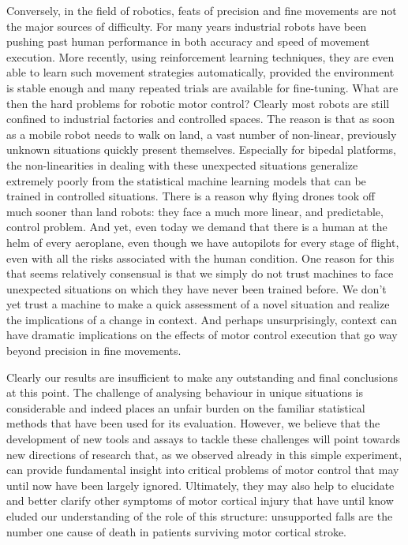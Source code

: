 Conversely, in the field of robotics, feats of precision and fine movements are not the major sources of difficulty. For many years industrial robots have been pushing past human performance in both accuracy and speed of movement execution. More recently, using reinforcement learning techniques, they are even able to learn such movement strategies automatically, provided the environment is stable enough and many repeated trials are available for fine-tuning. What are then the hard problems for robotic motor control? Clearly most robots are still confined to industrial factories and controlled spaces. The reason is that as soon as a mobile robot needs to walk on land, a vast number of non-linear, previously unknown situations quickly present themselves. Especially for bipedal platforms, the non-linearities in dealing with these unexpected situations generalize extremely poorly from the statistical machine learning models that can be trained in controlled situations. There is a reason why flying drones took off much sooner than land robots: they face a much more linear, and predictable, control problem. And yet, even today we demand that there is a human at the helm of every aeroplane, even though we have autopilots for every stage of flight, even with all the risks associated with the human condition. One reason for this that seems relatively consensual is that we simply do not trust machines to face unexpected situations on which they have never been trained before. We don't yet trust a machine to make a quick assessment of a novel situation and realize the implications of a change in context. And perhaps unsurprisingly, context can have dramatic implications on the effects of motor control execution that go way beyond precision in fine movements.

Clearly our results are insufficient to make any outstanding and final conclusions at this point. The challenge of analysing behaviour in unique situations is considerable and indeed places an unfair burden on the familiar statistical methods that have been used for its evaluation. However, we believe that the development of new tools and assays to tackle these challenges will point towards new directions of research that, as we observed already in this simple experiment, can provide fundamental insight into critical problems of motor control that may until now have been largely ignored. Ultimately, they may also help to elucidate and better clarify other symptoms of motor cortical injury that have until know eluded our understanding of the role of this structure: unsupported falls are the number one cause of death in patients surviving motor cortical stroke.
